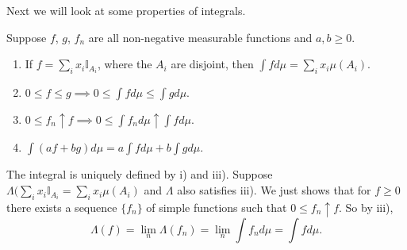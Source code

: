 \documentclass[11pt,fleqn]{book} %
\begin{document}
Next we will look at some properties of integrals.

\begin{theorem} \label{thm:integral-properties}
	Suppose $f$, $g$, $f_n$ are all non-negative measurable functions and $a,b \geq 0$.
	\begin{enumerate}[label=\roman*)]
		\item If $f = \sum_i x_i \mathbb{I}_{A_i}$, where the $A_i$ are disjoint, then $\int f d\mu = \sum_i x_i \mu(A_i)$.
		\item $0 \leq f \leq g \implies 0 \leq \int f d\mu \leq \int g d\mu$.
		\item $0 \leq f_n \uparrow f \implies 0 \leq \int f_n d\mu \uparrow \int f d\mu$.
		\item $\int (af+bg) d\mu = a \int f d\mu + b \int g d\mu$.
	\end{enumerate}
\end{theorem}

\begin{remark}\label{rem:integral-uniquely-defined}
	The integral is uniquely defined by i) and iii). Suppose $\Lambda(\sum_i x_i \mathbb{I}_{A_i} = \sum_i x_i \mu(A_i)$ and $\Lambda$ also satisfies iii). We just shows that for $f \geq 0$ there exists a sequence $\{f_n\}$ of simple functions such that $0 \leq f_n \uparrow f$. So by iii),
	\[
		\Lambda(f) = \lim_n \Lambda(f_n) = \lim_n \int f_n d\mu = \int f d\mu.
	\]
\end{remark}
\end{document}
